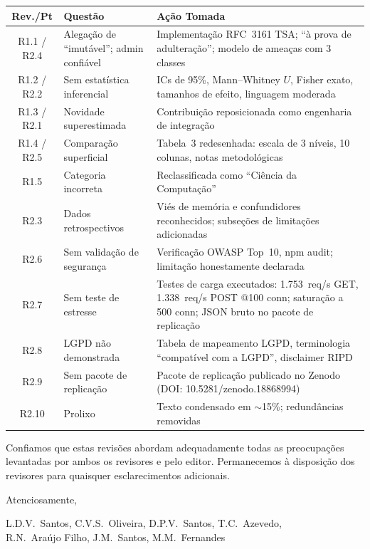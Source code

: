\documentclass[11pt,a4paper]{article}
\begin{document}
\begin{table}[h]
\centering
\small
\begin{tabular}{|c|p{5cm}|p{7cm}|}
\hline
\textbf{Rev./Pt} & \textbf{Questão} & \textbf{Ação Tomada} \\
\hline
R1.1 / R2.4 & Alegação de ``imutável''; admin confiável & Implementação RFC~3161 TSA; ``à prova de adulteração''; modelo de ameaças com 3 classes \\
\hline
R1.2 / R2.2 & Sem estatística inferencial & ICs de 95\%, Mann--Whitney $U$, Fisher exato, tamanhos de efeito, linguagem moderada \\
\hline
R1.3 / R2.1 & Novidade superestimada & Contribuição reposicionada como engenharia de integração \\
\hline
R1.4 / R2.5 & Comparação superficial & Tabela~3 redesenhada: escala de 3 níveis, 10 colunas, notas metodológicas \\
\hline
R1.5 & Categoria incorreta & Reclassificada como ``Ciência da Computação'' \\
\hline
R2.3 & Dados retrospectivos & Viés de memória e confundidores reconhecidos; subseções de limitações adicionadas \\
\hline
R2.6 & Sem validação de segurança & Verificação OWASP Top~10, npm audit; limitação honestamente declarada \\
\hline
R2.7 & Sem teste de estresse & Testes de carga executados: 1.753~req/s GET, 1.338~req/s POST @100 conn; saturação a 500 conn; JSON bruto no pacote de replicação \\
\hline
R2.8 & LGPD não demonstrada & Tabela de mapeamento LGPD, terminologia ``compatível com a LGPD'', disclaimer RIPD \\
\hline
R2.9 & Sem pacote de replicação & Pacote de replicação publicado no Zenodo (DOI: 10.5281/zenodo.18868994) \\
\hline
R2.10 & Prolixo & Texto condensado em $\sim$15\%; redundâncias removidas \\
\hline
\end{tabular}
\end{table}

\bigskip

\noindent Confiamos que estas revisões abordam adequadamente todas as preocupações levantadas por ambos os revisores e pelo editor. Permanecemos à disposição dos revisores para quaisquer esclarecimentos adicionais.

\bigskip
\noindent Atenciosamente,

\medskip
\noindent L.D.V.~Santos, C.V.S.~Oliveira, D.P.V.~Santos, T.C.~Azevedo,\\
R.N.~Araújo Filho, J.M.~Santos, M.M.~Fernandes
\end{document}
